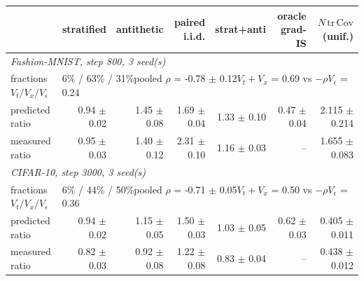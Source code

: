 \begin{tabular}{lrrrrrr}
\toprule
 & stratified & antithetic & paired i.i.d. & strat+anti & oracle grad-IS & $N\,\mathrm{tr}\,\mathrm{Cov}$ (unif.) \\
\midrule
\multicolumn{7}{l}{\textit{Fashion-MNIST, step 800, 3 seed(s)}} \\
fractions $V_t / V_x / V_\epsilon$ & \multicolumn{6}{l}{6\% / 63\% / 31\%\quad pooled $\rho$ = -0.78 $\pm$ 0.12\quad $V_t+V_x$ = 0.69 vs $-\rho V_\epsilon$ = 0.24} \\
predicted ratio & 0.94 $\pm$ 0.02 & 1.45 $\pm$ 0.08 & 1.69 $\pm$ 0.04 & 1.33 $\pm$ 0.10 & 0.47 $\pm$ 0.04 & 2.115 $\pm$ 0.214 \\
measured ratio & 0.95 $\pm$ 0.03 & 1.40 $\pm$ 0.12 & 2.31 $\pm$ 0.10 & 1.16 $\pm$ 0.03 & -- & 1.655 $\pm$ 0.083 \\
\midrule
\multicolumn{7}{l}{\textit{CIFAR-10, step 3000, 3 seed(s)}} \\
fractions $V_t / V_x / V_\epsilon$ & \multicolumn{6}{l}{6\% / 44\% / 50\%\quad pooled $\rho$ = -0.71 $\pm$ 0.05\quad $V_t+V_x$ = 0.50 vs $-\rho V_\epsilon$ = 0.36} \\
predicted ratio & 0.94 $\pm$ 0.02 & 1.15 $\pm$ 0.05 & 1.50 $\pm$ 0.03 & 1.03 $\pm$ 0.05 & 0.62 $\pm$ 0.03 & 0.405 $\pm$ 0.011 \\
measured ratio & 0.82 $\pm$ 0.03 & 0.92 $\pm$ 0.08 & 1.22 $\pm$ 0.08 & 0.83 $\pm$ 0.04 & -- & 0.438 $\pm$ 0.012 \\
\bottomrule
\end{tabular}
